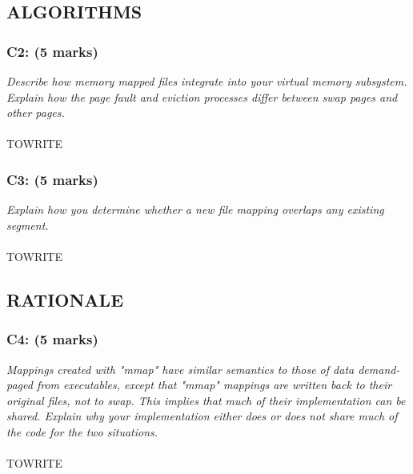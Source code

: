 \documentclass{article}
\begin{document}
\subsection{ALGORITHMS}

\subsubsection*{C2: (5 marks) }
\textit{Describe how memory mapped files integrate into your virtual
 memory subsystem.  Explain how the page fault and eviction
 processes differ between swap pages and other pages.}
\\ \\
TOWRITE


\subsubsection*{C3: (5 marks) }
\textit{Explain how you determine whether a new file mapping overlaps any existing segment. }
\\ \\
TOWRITE


\subsection{RATIONALE}

\subsubsection*{C4: (5 marks) }
\textit{Mappings created with "mmap" have similar semantics to those of
data demand-paged from executables, except that "mmap" mappings are
written back to their original files, not to swap.  This implies
that much of their implementation can be shared.  Explain why your
implementation either does or does not share much of the code for
the two situations.}
\\\ \\
TOWRITE
\end{document}
